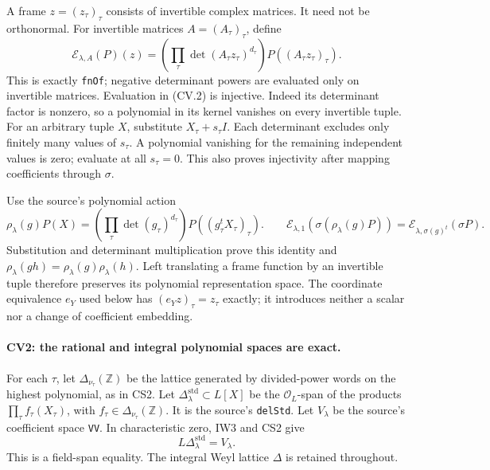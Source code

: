 \documentclass[11pt,a4paper]{article}
\numberwithin{equation}{section}
\theoremstyle{remark}\newtheorem{remark}[theorem]{Remark}
\begin{document}
A frame \(z=(z_\tau)_\tau\) consists of invertible complex
matrices. It need not be orthonormal. For invertible matrices
\(A=(A_\tau)_\tau\), define
\[
 \mathcal E_{\lambda,A}(P)(z)
   =\left(\prod_\tau\det(A_\tau z_\tau)^{d_\tau}\right)
                      P((A_\tau z_\tau)_\tau).
                                                               \tag{CV.2}
\]
This is exactly \texttt{fnOf}; negative determinant powers are
evaluated only on invertible matrices. Evaluation in (CV.2) is
injective. Indeed its determinant factor is nonzero, so a
polynomial in its kernel vanishes on every invertible tuple.
For an arbitrary tuple \(X\), substitute
\(X_\tau+s_\tau I\). Each determinant excludes only finitely
many values of \(s_\tau\). A polynomial vanishing for the
remaining independent values is zero; evaluate at all
\(s_\tau=0\). This also proves injectivity after mapping
coefficients through \(\sigma\).

Use the source's polynomial action
\[
 \rho_\lambda(g)P(X)
   =\left(\prod_\tau\det(g_\tau)^{d_\tau}\right)
                              P((g_\tau^tX_\tau)_\tau).
 \qquad
 \mathcal E_{\lambda,1}(\sigma(\rho_\lambda(g)P))
       =\mathcal E_{\lambda,\sigma(g)^t}(\sigma P).
                                                               \tag{CV.3}
\]
Substitution and determinant multiplication prove this identity
and \(\rho_\lambda(gh)=\rho_\lambda(g)\rho_\lambda(h)\).
Left translating a frame function by an invertible tuple
therefore preserves its polynomial representation space.
The coordinate equivalence \(e_Y\) used below has
\((e_Yz)_\tau=z_\tau\) exactly; it introduces neither a scalar
nor a change of coefficient embedding.

\paragraph{CV2: the rational and integral polynomial spaces are exact.}
For each \(\tau\), let
\(\Delta_{\nu_\tau}(\mathbb Z)\) be the lattice generated by
divided-power words on the highest polynomial, as in CS2.
Let \(\Delta_\lambda^{\mathrm{std}}\subset L[X]\) be the
\(\mathcal O_L\)-span of the products
\(\prod_\tau f_\tau(X_\tau)\), with
\(f_\tau\in\Delta_{\nu_\tau}(\mathbb Z)\).
It is the source's \texttt{delStd}.
Let \(V_\lambda\) be the source's coefficient space
\texttt{VV}. In characteristic zero, IW3 and CS2 give
\[
       L\Delta_\lambda^{\mathrm{std}}=V_\lambda.
\]
This is a field-span equality. The integral Weyl lattice
\(\Delta\) is retained throughout.
\end{document}
